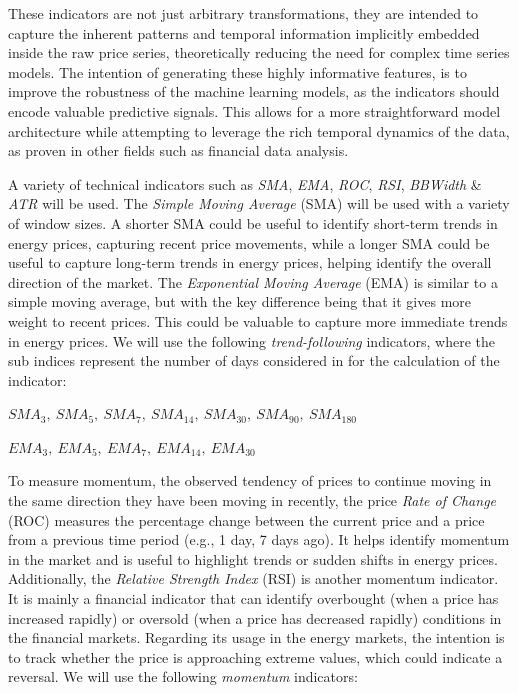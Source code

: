 \documentclass[12pt]{report} %
\begin{document}

These indicators are not just arbitrary transformations, they are intended to capture the inherent patterns and temporal information implicitly embedded inside the raw price series, theoretically reducing the need for complex time series models. The intention of generating these highly informative features, is to improve the robustness of the machine learning models, as the indicators should encode valuable predictive signals. This allows for a more straightforward model architecture while attempting to leverage the rich temporal dynamics of the data, as proven in other fields such as financial data analysis.

A variety of technical indicators such as \textit{SMA}, \textit{EMA}, \textit{ROC}, \textit{RSI}, \textit{BBWidth} \& \textit{ATR} will be used. The \textit{Simple Moving Average} (SMA) will be used with a variety of window sizes. A shorter SMA could be useful to identify short-term trends in energy prices, capturing recent price movements, while a longer SMA could be useful to capture long-term trends in energy prices, helping identify the overall direction of the market. The \textit{Exponential Moving Average} (EMA) is similar to a simple moving average, but with the key difference being that it gives more weight to recent prices. This could be valuable to capture more immediate trends in energy prices. We will use the following \textit{trend-following} indicators, where the sub indices represent the number of days considered in for the calculation of the indicator:

    $ SMA_{3},\ SMA_{5},\ SMA_{7},\ SMA_{14},\ SMA_{30},\ SMA_{90},\ SMA_{180} $
    
    $ EMA_{3},\ EMA_{5},\ EMA_{7},\ EMA_{14},\ EMA_{30}  $

To measure momentum, the observed tendency of prices to continue moving in the same direction they have been moving in recently, the price \textit{Rate of Change} (ROC) measures the percentage change between the current price and a price from a previous time period (e.g., 1 day, 7 days ago). It helps identify momentum in the market and is useful to highlight trends or sudden shifts in energy prices. Additionally, the \textit{Relative Strength Index} (RSI) is another momentum indicator. It is mainly a financial indicator that can identify overbought (when a price has increased rapidly) or oversold (when a price has decreased rapidly) conditions in the financial markets. Regarding its usage in the energy markets, the intention is to track whether the price is approaching extreme values, which could indicate a reversal. We will use the following \textit{momentum} indicators:
\end{document}
